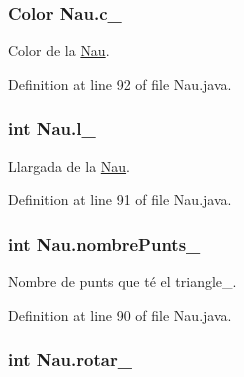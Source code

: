 \hypertarget{class_nau_a5447088ba94469c8f4285650b25211fa}{}
\subsubsection[{c\+\_\+}]{\setlength{\rightskip}{0pt plus 5cm}Color Nau.\+c\+\_\+\hspace{0.3cm}{\ttfamily [private]}}\label{class_nau_a5447088ba94469c8f4285650b25211fa}


Color de la \hyperlink{class_nau}{Nau}. 



Definition at line 92 of file Nau.\+java.

\hypertarget{class_nau_a67c5417119c7e520e1876a919119867d}{}
\subsubsection[{l\+\_\+}]{\setlength{\rightskip}{0pt plus 5cm}int Nau.\+l\+\_\+\hspace{0.3cm}{\ttfamily [protected]}}\label{class_nau_a67c5417119c7e520e1876a919119867d}


Llargada de la \hyperlink{class_nau}{Nau}. 



Definition at line 91 of file Nau.\+java.

\hypertarget{class_nau_adaf4948df660e9cfcac14a3fb75de454}{}
\subsubsection[{nombre\+Punts\+\_\+}]{\setlength{\rightskip}{0pt plus 5cm}int Nau.\+nombre\+Punts\+\_\+\hspace{0.3cm}{\ttfamily [private]}}\label{class_nau_adaf4948df660e9cfcac14a3fb75de454}


Nombre de punts que té el triangle\+\_\+. 



Definition at line 90 of file Nau.\+java.

\hypertarget{class_nau_a128a1860c49ef16bfd63406f4ef0db75}{}
\subsubsection[{rotar\+\_\+}]{\setlength{\rightskip}{0pt plus 5cm}int Nau.\+rotar\+\_\+\hspace{0.3cm}{\ttfamily [private]}}\label{class_nau_a128a1860c49ef16bfd63406f4ef0db75}



